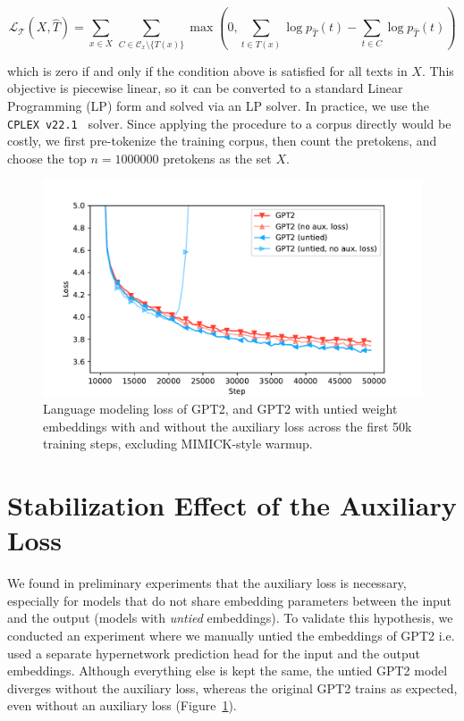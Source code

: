 \documentclass{article}
\begin{document}
\[
\mathcal{L_{T}}(X, \hat{T}) = \sum_{x \in X}\,\sum_{C \in \mathcal{C}_x \setminus \{T(x)\}} \max\left(0, \sum_{t \in T(x)} \log p_{\hat{T}}(t) - \sum_{t \in C} \log p_{\hat{T}}(t)\right)
\]

which is zero if and only if the condition above is satisfied for all texts in $X$. This objective is piecewise linear, so it can be converted to a standard Linear Programming (LP) form and solved via an LP solver. In practice, we use the \texttt{CPLEX v22.1}~\citep{cplex2022v22} solver. Since applying the procedure to a corpus directly would be costly, we first pre-tokenize the training corpus, then count the pretokens, and choose the top $n=1000000$ pretokens as the set $X$.

\begin{figure}[h]
    \centering
    \includegraphics[width=0.7\linewidth]{figures/auxiliary_loss.pdf}
    \caption{Language modeling loss of GPT2, and GPT2 with untied weight embeddings with and without the auxiliary loss across the first 50k training steps, excluding MIMICK-style warmup.}
    \label{fig:aux_loss}
\end{figure}

\section{Stabilization Effect of the Auxiliary Loss}
\label{appendix:auxiliary}

We found in preliminary experiments that the auxiliary loss is necessary, especially for models that do not share embedding parameters between the input and the output (models with \textit{untied} embeddings). To validate this hypothesis, we conducted an experiment where we manually untied the embeddings of GPT2 i.e. used a separate hypernetwork prediction head for the input and the output embeddings. Although everything else is kept the same, the untied GPT2 model diverges without the auxiliary loss, whereas the original GPT2 trains as expected, even without an auxiliary loss (Figure~\ref{fig:aux_loss}).
\end{document}
